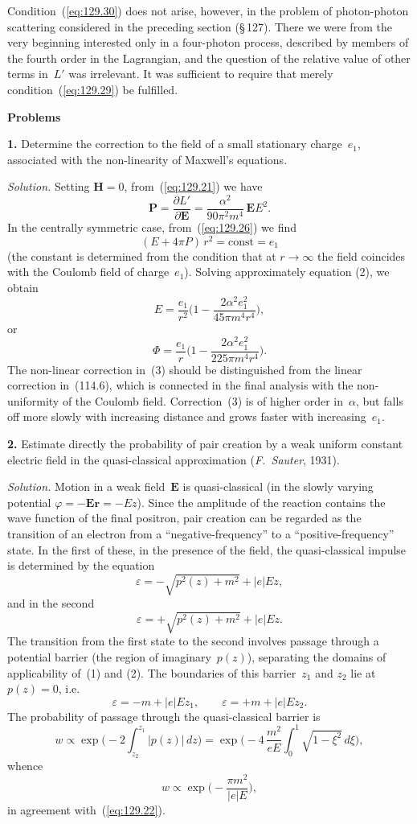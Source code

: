 
Condition~(\ref{eq:129.30}) does not arise, however, in the problem of photon-photon scattering considered in the preceding section (\S\,127). There we were from the very beginning interested only in a four-photon process, described by members of the fourth order in the Lagrangian, and the question of the relative value of other terms in~$L'$ was irrelevant. It was sufficient to require that merely condition~(\ref{eq:129.29}) be fulfilled.

\bigskip
\textbf{Problems}

\noindent\textbf{1.} Determine the correction to the field of a small stationary charge~$e_1$, associated with the non-linearity of Maxwell's equations.

\emph{Solution.} Setting $\mathbf{H}=0$, from~(\ref{eq:129.21}) we have
\[
\mathbf{P} = \frac{\partial L'}{\partial\mathbf{E}} = \frac{\alpha^2}{90\pi^2 m^4}\,\mathbf{E}E^2.
\]
In the centrally symmetric case, from~(\ref{eq:129.26}) we find
\[
(E + 4\pi P)\,r^2 = \text{const} = e_1
\]
(the constant is determined from the condition that at $r\to\infty$ the field coincides with the Coulomb field of charge~$e_1$). Solving approximately equation (2), we obtain
\[
E = \frac{e_1}{r^2}\biggl(1 - \frac{2\alpha^2 e_1^2}{45\pi m^4 r^4}\biggr),
\]
or
\[
\Phi = \frac{e_1}{r}\biggl(1 - \frac{2\alpha^2 e_1^2}{225\pi m^4 r^4}\biggr).
\]
The non-linear correction in~(3) should be distinguished from the linear correction in~(114.6), which is connected in the final analysis with the non-uniformity of the Coulomb field. Correction~(3) is of higher order in~$\alpha$, but falls off more slowly with increasing distance and grows faster with increasing~$e_1$.

\noindent\textbf{2.} Estimate directly the probability of pair creation by a weak uniform constant electric field in the quasi-classical approximation (\emph{F.~Sauter}, 1931).

\emph{Solution.} Motion in a weak field~$\mathbf{E}$ is quasi-classical (in the slowly varying potential $\varphi = -\mathbf{E}\mathbf{r} = -Ez$). Since the amplitude of the reaction contains the wave function of the final positron, pair creation can be regarded as the transition of an electron from a ``negative-frequency'' to a ``positive-frequency'' state. In the first of these, in the presence of the field, the quasi-classical impulse is determined by the equation
\[
\varepsilon = -\sqrt{p^2(z) + m^2} + |e|Ez,\tag{1}
\]
and in the second
\[
\varepsilon = +\sqrt{p^2(z) + m^2} + |e|Ez.\tag{2}
\]
The transition from the first state to the second involves passage through a potential barrier (the region of imaginary~$p(z)$), separating the domains of applicability of~(1) and (2). The boundaries of this barrier~$z_1$ and $z_2$ lie at $p(z) = 0$, i.e.
\[
\varepsilon = -m + |e|Ez_1,\qquad \varepsilon = +m + |e|Ez_2.
\]
The probability of passage through the quasi-classical barrier is
\[
w \propto \exp\biggl(-2\int_{z_2}^{z_1}|p(z)|\,dz\biggr) = \exp\biggl(-4\,\frac{m^2}{eE}\int_0^1\sqrt{1-\xi^2}\,d\xi\biggr),
\]
whence
\[
w \propto \exp\biggl(-\frac{\pi m^2}{|e|E}\biggr),
\]
in agreement with~(\ref{eq:129.22}).
